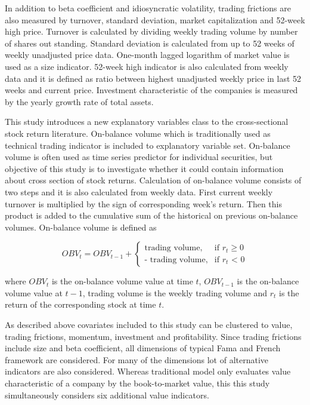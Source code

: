 \documentclass[12pt]{article}
\begin{document}

In addition to beta coefficient and idiosyncratic volatility, trading frictions are also measured by turnover, standard deviation, market capitalization and 52-week high price. Turnover is calculated by dividing weekly trading volume by number of shares out standing. Standard deviation is calculated from up to 52 weeks of weekly unadjusted price data. One-month lagged logarithm of market value is used as a size indicator. 52-week high indicator is also calculated from weekly data and it is defined as ratio between highest unadjusted weekly price in last 52 weeks and current price. Investment characteristic of the companies is measured by the yearly growth rate of total assets. \par

This study introduces a new explanatory variables class to the cross-sectional stock return literature. On-balance volume which is traditionally used as technical trading indicator is included to explanatory variable set. On-balance volume is often used as time series predictor for individual securities, but objective of this study is to investigate whether it could contain information about cross section of stock returns. Calculation of on-balance volume consists of two steps and it is also calculated from weekly data. First current weekly turnover is multiplied by the sign of corresponding week's return. Then this product is added to the cumulative sum of the historical on previous on-balance volumes. On-balance volume is defined as \par

\begin{equation}
\label{eq:OBV}
OBV_t = OBV_{t-1} + 
\begin{cases}
    \text{trading volume}, 	& \text{if $r_t$} \geq \text{0}\\
    \text{- trading volume},	& \text{if $r_t$ < 0}
\end{cases}
\end{equation}

where $OBV_t$ is the on-balance volume value at time $t$, $OBV_{t-1}$ is the on-balance volume value at $t-1$, trading volume is the weekly trading volume and $r_t$ is the return of the corresponding stock at time $t$. \par

As described above covariates included to this study can be clustered to value, trading frictions, momentum, investment and profitability. Since trading frictions include size and beta coefficient, all dimensions of typical Fama and French framework are considered. For many of the dimensions lot of alternative indicators are also considered. Whereas traditional \citet{FAMA19933} model only evaluates value characteristic of a company by the book-to-market value, this this study simultaneously considers six additional value indicators. \par
\end{document}
